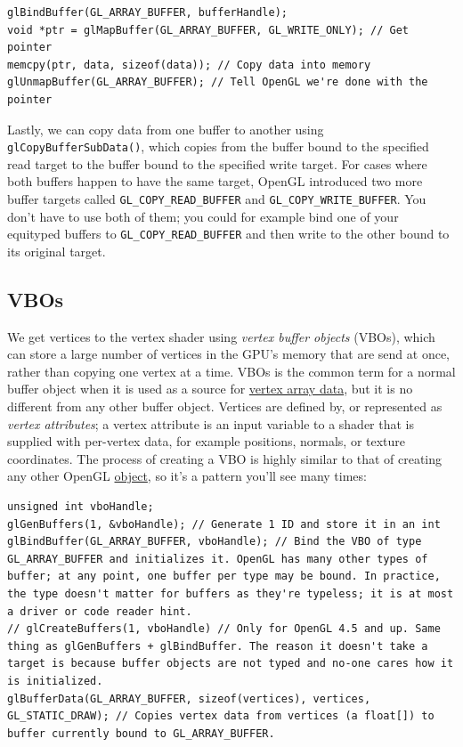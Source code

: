\documentclass[table, xcdraw]{article}%
\begin{document}
\begin{verbatim}
glBindBuffer(GL_ARRAY_BUFFER, bufferHandle);
void *ptr = glMapBuffer(GL_ARRAY_BUFFER, GL_WRITE_ONLY); // Get pointer
memcpy(ptr, data, sizeof(data)); // Copy data into memory
glUnmapBuffer(GL_ARRAY_BUFFER); // Tell OpenGL we're done with the pointer
\end{verbatim}

Lastly, we can copy data from one buffer to another using \texttt{glCopyBufferSubData()}, which copies from the buffer bound to the specified read target to the buffer bound to the specified write target. For cases where both buffers happen to have the same target, OpenGL introduced two more buffer targets called \texttt{GL_COPY_READ_BUFFER} and \texttt{GL_COPY_WRITE_BUFFER}. You don't have to use both of them; you could for example bind one of your equityped buffers to \texttt{GL_COPY_READ_BUFFER} and then write to the other bound to its original target.

\subsection{VBOs} \label{vbos}

We get vertices to the vertex shader using \emph{vertex buffer objects} (VBOs), which can store a large number of vertices in the GPU's memory that are send at once, rather than copying one vertex at a time. VBOs is the common term for a normal buffer object when it is used as a source for \hyperref[vaos]{vertex array data}, but it is no different from any other buffer object. Vertices are defined by, or represented as \emph{vertex attributes}; a vertex attribute is an input variable to a shader that is supplied with per-vertex data, for example positions, normals, or texture coordinates. The process of creating a VBO is highly similar to that of creating any other OpenGL \hyperref[intro]{object}, so it's a pattern you'll see many times:

\begin{verbatim}
unsigned int vboHandle;
glGenBuffers(1, &vboHandle); // Generate 1 ID and store it in an int
glBindBuffer(GL_ARRAY_BUFFER, vboHandle); // Bind the VBO of type GL_ARRAY_BUFFER and initializes it. OpenGL has many other types of buffer; at any point, one buffer per type may be bound. In practice, the type doesn't matter for buffers as they're typeless; it is at most a driver or code reader hint.
// glCreateBuffers(1, vboHandle) // Only for OpenGL 4.5 and up. Same thing as glGenBuffers + glBindBuffer. The reason it doesn't take a target is because buffer objects are not typed and no-one cares how it is initialized.
glBufferData(GL_ARRAY_BUFFER, sizeof(vertices), vertices, GL_STATIC_DRAW); // Copies vertex data from vertices (a float[]) to buffer currently bound to GL_ARRAY_BUFFER.
\end{verbatim}
\end{document}

